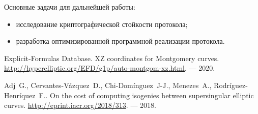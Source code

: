 \documentclass[a4paper,12pt]{article}
\theoremstyle{definition}
\renewcommand{\baselinestretch}{1.35}
\begin{document}
Основные задачи для дальнейшей работы:
\begin{itemize}

 \item  исследование криптографической стойкости протокола;

 \item  разработка оптимизированной программной реализации протокола.
\end{itemize}

\newpage

  \renewcommand{\baselinestretch}{.9}\large
\newcommand{\noopsort}[1]{} \newcommand{\printfirst}[2]{#1}
  \newcommand{\singleletter}[1]{#1} \newcommand{\switchargs}[2]{#2#1}
\begin{thebibliography}{1}







 Explicit-Formulas Database. XZ coordinates for Montgomery curves. \url{http://hyperelliptic.org/EFD/g1p/auto-montgom-xz.html}. --- 2020.





 Adj~G., Cervantes-Vázquez~D., Chi-Domínguez~J-J.,  Menezes~A., Rodríguez-Henríquez~F.. On the cost of computing isogenies between supersingular elliptic curves.  \url{http://eprint.iacr.org/2018/313}. --- 2018.



\end{thebibliography}
\end{document}
